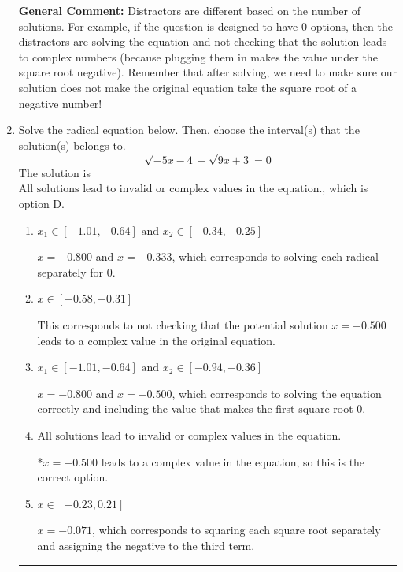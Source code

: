 \documentclass{extbook}[14pt]
\newcommand{\litem}[1]{\item #1

\rule{\textwidth}{0.4pt}}
\begin{document}
\begin{enumerate}
{\textbf{General Comment:} Distractors are different based on the number of solutions. For example, if the question is designed to have 0 options, then the distractors are solving the equation and not checking that the solution leads to complex numbers (because plugging them in makes the value under the square root negative). Remember that after solving, we need to make sure our solution does not make the original equation take the square root of a negative number!
}
\litem{
Solve the radical equation below. Then, choose the interval(s) that the solution(s) belongs to.
\[ \sqrt{-5 x - 4} - \sqrt{9 x + 3} = 0 \]The solution is \( \text{All solutions lead to invalid or complex values in the equation.} \), which is option D.\begin{enumerate}[label=\Alph*.]
\item \( x_1 \in [-1.01, -0.64] \text{ and } x_2 \in [-0.34,-0.25] \)

$x = -0.800$ and $x = -0.333$, which corresponds to solving each radical separately for 0.
\item \( x \in [-0.58,-0.31] \)

This corresponds to not checking that the potential solution $x = -0.500$ leads to a complex value in the original equation.
\item \( x_1 \in [-1.01, -0.64] \text{ and } x_2 \in [-0.94,-0.36] \)

$x = -0.800$ and $x = -0.500$, which corresponds to solving the equation correctly and including the value that makes the first square root 0.
\item \( \text{All solutions lead to invalid or complex values in the equation.} \)

*$x = -0.500$ leads to a complex value in the equation, so this is the correct option.
\item \( x \in [-0.23,0.21] \)

$x = -0.071$, which corresponds to squaring each square root separately and assigning the negative to the third term.
\end{enumerate}

}
\end{enumerate}
\end{document}
